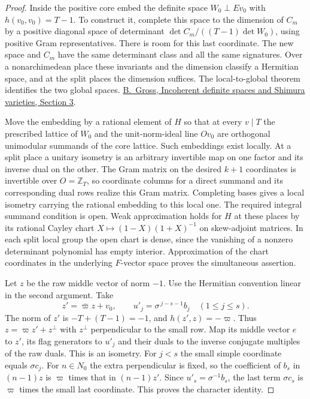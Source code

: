 \documentclass[a4paper,11pt]{article}
\theoremstyle{definition}
\theoremstyle{remark}
\numberwithin{equation}{section}
\begin{document}
\begin{proof}
Inside the positive core embed the definite space
\(W_0\perp E v_0\) with \(h(v_0,v_0)=T-1\). To construct it,
complete this space to the dimension of \(C_m\) by a positive
diagonal space of determinant
\(\det C_m/((T-1)\det W_0)\), using positive Gram representatives.
There is room for this last coordinate. The new space and \(C_m\)
have the same determinant class and all the same signatures.
Over a nonarchimedean place these invariants and the dimension
classify a Hermitian space, and at the split places the dimension
suffices. The local-to-global theorem identifies the two global
spaces. \href{https://people.math.harvard.edu/~gross/preprints/incoherent.pdf}
{B.~Gross, Incoherent definite spaces and Shimura varieties, Section 3}.

Move the embedding by a rational element of \(H\) so that at
every \(v\mid T\) the prescribed lattice of \(W_0\) and the
unit-norm-ideal line \(Ov_0\) are orthogonal unimodular
summands of the core lattice. Such embeddings exist locally.
At a split place a unitary isometry is an arbitrary invertible
map on one factor and its inverse dual on the other. The
Gram matrix on the desired \(k+1\) coordinates is invertible
over \(O=\mathbb Z_T\), so coordinate columns for a direct
summand and its corresponding dual rows realize this Gram
matrix. Completing bases gives a local isometry carrying the
rational embedding to this local one. The required integral
summand condition is open. Weak approximation holds for \(H\)
at these places by its rational Cayley chart
\(X\mapsto(1-X)(1+X)^{-1}\) on skew-adjoint matrices. In each
split local group the open chart is dense, since the vanishing
of a nonzero determinant polynomial has empty interior.
Approximation of the chart coordinates in the underlying
\(F\)-vector space proves the simultaneous assertion.

Let \(z\) be the raw middle vector of norm \(-1\). Use the
Hermitian convention linear in the second argument. Take
\[
       z'=\bar\varpi z+v_0,\qquad
       u'_j=\sigma^{\,j-s-1}b_j\quad (1\le j\le s).
\]
The norm of \(z'\) is \(-T+(T-1)=-1\), and
\(h(z',z)=-\varpi\). Thus \(z=\varpi z'+z^\perp\)
with \(z^\perp\) perpendicular to the small row. Map its
middle vector \(e\) to \(z'\), its flag generators to \(u'_j\)
and their duals to the inverse conjugate multiples of the
raw duals. This is an isometry. For \(j<s\) the small
simple coordinate equals \(\sigma c_j\). For \(n\in N_0\)
the extra perpendicular is fixed, so the coefficient of
\(b_s\) in \((n-1)z\) is \(\varpi\) times that in
\((n-1)z'\). Since \(u'_s=\sigma^{-1}b_s\), the last term
\(\sigma c_s\) is \(\varpi\) times the small last coordinate.
This proves the character identity.


\end{proof}
\end{document}
